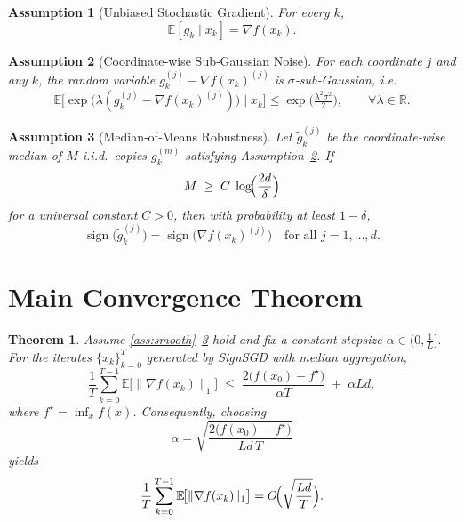 \documentclass{article}
\newtheorem{theorem}{Theorem}
\newtheorem{assumption}{Assumption}
\newcommand{\E}{\mathbb{E}}
\newcommand{\R}{\mathbb{R}}
\newcommand{\sign}{\operatorname{sign}}
\begin{document}
\begin{assumption}[Unbiased Stochastic Gradient]\label{ass:unbiased}
For every $k$,
\[
\E[g_k\mid x_k]=\nabla f(x_k).
\]
\end{assumption}

\begin{assumption}[Coordinate‑wise Sub‑Gaussian Noise]\label{ass:subg}
For each coordinate $j$ and any $k$, the random variable
$g_k^{(j)}-\nabla f(x_k)^{(j)}$ is $\sigma$‑sub‑Gaussian, i.e.
\[
\E\!\bigl[\exp\!\bigl(\lambda (g_k^{(j)}-\nabla f(x_k)^{(j)})\bigr)\mid x_k\bigr]
\le \exp\!\bigl(\tfrac{\lambda^{2}\sigma^{2}}{2}\bigr),
\qquad\forall\lambda\in\R .
\]
\end{assumption}

\begin{assumption}[Median‑of‑Means Robustness]\label{ass:median}
Let $\tilde{g}_k^{(j)}$ be the coordinate‑wise median of $M$ i.i.d.\ copies
$g_k^{(m)}$ satisfying Assumption~\ref{ass:subg}.  
If
\[
M\;\ge\; C\;\log\!\Bigl(\frac{2d}{\delta}\Bigr)
\]
for a universal constant $C>0$, then with probability at least $1-\delta$,
\[
\sign\!\bigl(\tilde{g}_k^{(j)}\bigr)=\sign\!\bigl(\nabla f(x_k)^{(j)}\bigr)
\quad\text{for all }j=1,\dots,d .
\]
\end{assumption}

\section*{Main Convergence Theorem}
\begin{theorem}\label{thm:main}
Assume \ref{ass:smooth}–\ref{ass:median} hold and fix a constant stepsize
$\alpha\in\bigl(0,\frac{1}{L}\bigr]$.  For the iterates $\{x_k\}_{k=0}^{T}$ generated by SignSGD with median aggregation,
\[
\frac{1}{T}\sum_{k=0}^{T-1}\E\!\bigl[\|\nabla f(x_k)\|_{1}\bigr]
\;\le\;
\frac{2\bigl(f(x_0)-f^{\star}\bigr)}{\alpha T}
\;+\;
\alpha L d,
\tag{*}
\]
where $f^{\star}= \inf_{x}f(x)$.  Consequently, choosing
\[
\alpha=\sqrt{\frac{2\bigl(f(x_0)-f^{\star}\bigr)}{L d\,T}}
\]
yields
\[
\frac{1}{T}\sum_{k=0}^{T-1}\E\!\bigl[\|\nabla f(x_k)\|_{1}\bigr]
=O\!\Bigl(\sqrt{\frac{L d}{T}}\Bigr).
\]
\end{theorem}
\end{document}
